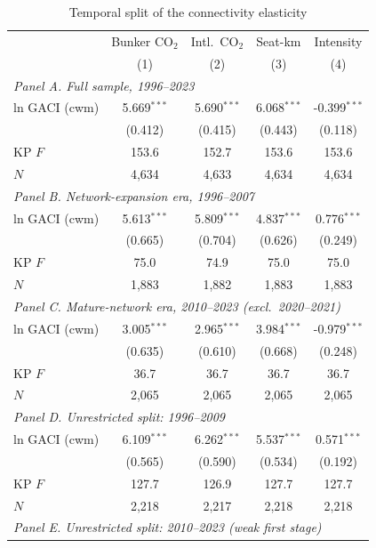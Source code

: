 \documentclass[11pt]{article}
\begin{document}
\begin{table}[htbp]
\centering
\begin{threeparttable}
\caption{Temporal split of the connectivity elasticity}
\label{tab:temporal}
\footnotesize
\begin{tabular}{lcccc}
\toprule
 & \multicolumn{1}{c}{Bunker CO$_2$} & \multicolumn{1}{c}{Intl.\ CO$_2$} & \multicolumn{1}{c}{Seat-km} & \multicolumn{1}{c}{Intensity} \\
 & (1) & (2) & (3) & (4) \\
\midrule
\multicolumn{5}{l}{\textit{Panel A. Full sample, 1996--2023}} \\
  ln GACI (cwm) & 5.669$^{***}$ & 5.690$^{***}$ & 6.068$^{***}$ & -0.399$^{***}$ \\
   & (0.412) & (0.415) & (0.443) & (0.118) \\
  KP $F$ & 153.6 & 152.7 & 153.6 & 153.6 \\
  $N$ & 4,634 & 4,633 & 4,634 & 4,634 \\
\midrule
\multicolumn{5}{l}{\textit{Panel B. Network-expansion era, 1996--2007}} \\
  ln GACI (cwm) & 5.613$^{***}$ & 5.809$^{***}$ & 4.837$^{***}$ & 0.776$^{***}$ \\
   & (0.665) & (0.704) & (0.626) & (0.249) \\
  KP $F$ & 75.0 & 74.9 & 75.0 & 75.0 \\
  $N$ & 1,883 & 1,882 & 1,883 & 1,883 \\
\midrule
\multicolumn{5}{l}{\textit{Panel C. Mature-network era, 2010--2023 (excl.\ 2020--2021)}} \\
  ln GACI (cwm) & 3.005$^{***}$ & 2.965$^{***}$ & 3.984$^{***}$ & -0.979$^{***}$ \\
   & (0.635) & (0.610) & (0.668) & (0.248) \\
  KP $F$ & 36.7 & 36.7 & 36.7 & 36.7 \\
  $N$ & 2,065 & 2,065 & 2,065 & 2,065 \\
\midrule
\multicolumn{5}{l}{\textit{Panel D. Unrestricted split: 1996--2009}} \\
  ln GACI (cwm) & 6.109$^{***}$ & 6.262$^{***}$ & 5.537$^{***}$ & 0.571$^{***}$ \\
   & (0.565) & (0.590) & (0.534) & (0.192) \\
  KP $F$ & 127.7 & 126.9 & 127.7 & 127.7 \\
  $N$ & 2,218 & 2,217 & 2,218 & 2,218 \\
\midrule
\multicolumn{5}{l}{\textit{Panel E. Unrestricted split: 2010--2023 (weak first stage)}} \\

\end{tabular}
\end{threeparttable}
\end{table}
\end{document}
